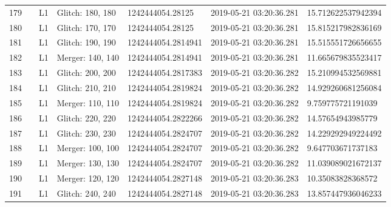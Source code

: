 \begin{longtable}{lllllll}
179  &                                                    &       L1 &  Glitch: 180, 180 &    1242444054.28125 &  2019-05-21 03:20:36.281 &  15.712622537942394 \\
180  &                                                    &       L1 &  Glitch: 170, 170 &    1242444054.28125 &  2019-05-21 03:20:36.281 &  15.815217982836169 \\
181  &                                                    &       L1 &  Glitch: 190, 190 &  1242444054.2814941 &  2019-05-21 03:20:36.281 &  15.515551726656655 \\
182  &                                                    &       L1 &  Merger: 140, 140 &  1242444054.2814941 &  2019-05-21 03:20:36.281 &  11.665679835523417 \\
183  &                                                    &       L1 &  Glitch: 200, 200 &  1242444054.2817383 &  2019-05-21 03:20:36.282 &  15.210994532569881 \\
184  &                                                    &       L1 &  Glitch: 210, 210 &  1242444054.2819824 &  2019-05-21 03:20:36.282 &  14.929260681256084 \\
185  &                                                    &       L1 &  Merger: 110, 110 &  1242444054.2819824 &  2019-05-21 03:20:36.282 &   9.759775721191039 \\
186  &                                                    &       L1 &  Glitch: 220, 220 &  1242444054.2822266 &  2019-05-21 03:20:36.282 &   14.57654943985779 \\
187  &                                                    &       L1 &  Glitch: 230, 230 &  1242444054.2824707 &  2019-05-21 03:20:36.282 &  14.229292949224492 \\
188  &                                                    &       L1 &  Merger: 100, 100 &  1242444054.2824707 &  2019-05-21 03:20:36.282 &   9.647703671737183 \\
189  &                                                    &       L1 &  Merger: 130, 130 &  1242444054.2824707 &  2019-05-21 03:20:36.282 &  11.039089021672137 \\
190  &                                                    &       L1 &  Merger: 120, 120 &  1242444054.2827148 &  2019-05-21 03:20:36.283 &   10.35083828368572 \\
191  &                                                    &       L1 &  Glitch: 240, 240 &  1242444054.2827148 &  2019-05-21 03:20:36.283 &  13.857447936046233 \\

\end{longtable}
